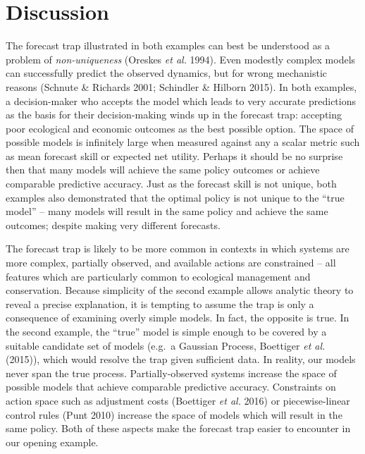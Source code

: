 \documentclass[3p]{elsarticle} %
\begin{document}
\hypertarget{discussion}{%
\section{Discussion}\label{discussion}}

The forecast trap illustrated in both examples can best be understood as
a problem of \emph{non-uniqueness} (Oreskes \emph{et al.} 1994). Even
modestly complex models can successfully predict the observed dynamics,
but for wrong mechanistic reasons (Schnute \& Richards 2001; Schindler
\& Hilborn 2015). In both examples, a decision-maker who accepts the
model which leads to very accurate predictions as the basis for their
decision-making winds up in the forecast trap: accepting poor ecological
and economic outcomes as the best possible option. The space of possible
models is infinitely large when measured against any a scalar metric
such as mean forecast skill or expected net utility. Perhaps it should
be no surprise then that many models will achieve the same policy
outcomes or achieve comparable predictive accuracy. Just as the forecast
skill is not unique, both examples also demonstrated that the optimal
policy is not unique to the ``true model'' -- many models will result in
the same policy and achieve the same outcomes; despite making very
different forecasts.

The forecast trap is likely to be more common in contexts in which
systems are more complex, partially observed, and available actions are
constrained -- all features which are particularly common to ecological
management and conservation. Because simplicity of the second example
allows analytic theory to reveal a precise explanation, it is tempting
to assume the trap is only a consequence of examining overly simple
models. In fact, the opposite is true. In the second example, the
``true'' model is simple enough to be covered by a suitable candidate
set of models (e.g.~a Gaussian Process, Boettiger \emph{et al.} (2015)),
which would resolve the trap given sufficient data. In reality, our
models never span the true process. Partially-observed systems increase
the space of possible models that achieve comparable predictive
accuracy. Constraints on action space such as adjustment costs
(Boettiger \emph{et al.} 2016) or piecewise-linear control rules (Punt
2010) increase the space of models which will result in the same policy.
Both of these aspects make the forecast trap easier to encounter in our
opening example.
\end{document}
